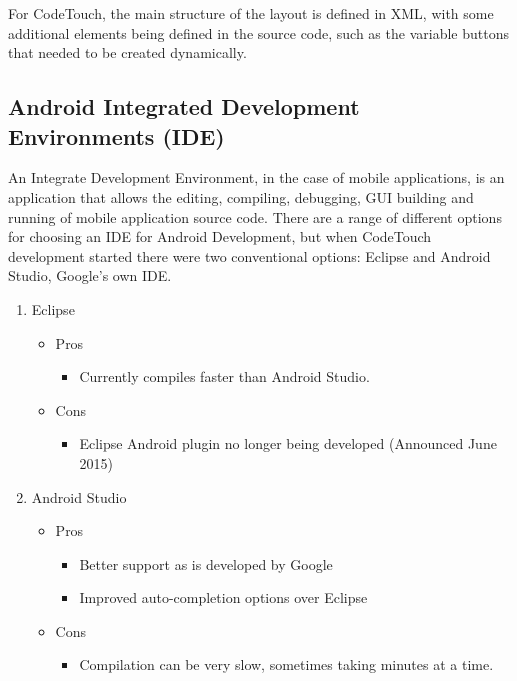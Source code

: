 \documentclass[ %
                    author={Jonathan Rankin},
                supervisor={Dr. David May, Dr. Ian Holyer},
                    degree={MEng},
                     title={CodeTouch},
                  subtitle={A Revolutionary Way To Program Real Code On Touch Screen Devices},
                      type={enterprise},
                      year={2015 } ]{dissertation}
\begin{document}
For CodeTouch, the main structure of the layout is defined in XML, with some additional elements being defined in the source code, such as the variable buttons that needed to be created dynamically. 




\subsection{Android Integrated Development Environments (IDE)}\label{sec:andIDE}
An Integrate Development Environment, in the case of mobile applications, is an application that allows the editing, compiling, debugging, GUI building and running of mobile application source code. There are a range of different options for choosing an IDE for Android Development, but when CodeTouch development started there were two conventional options: Eclipse and Android Studio, Google's own IDE. 
\begin{enumerate}
\item Eclipse
\begin{itemize}
\item Pros
\begin{itemize}
\item Currently compiles faster than Android Studio.
\end{itemize}
\end{itemize}
\begin{itemize}
\item Cons
\begin{itemize}
\item Eclipse Android plugin no longer being developed (Announced June 2015)
\end{itemize}
\end{itemize}

\item Android Studio
\begin{itemize}
\item Pros
\begin{itemize}
\item Better support as is developed by Google
\item Improved auto-completion options over Eclipse
\end{itemize}
\end{itemize}
\begin{itemize}
\item Cons
\begin{itemize}
\item Compilation can be very slow, sometimes taking minutes at a time.
\end{itemize}
\end{itemize}
\end{enumerate}
\end{document}
